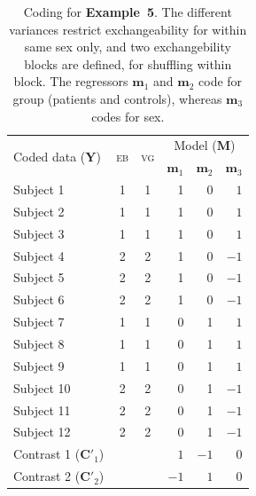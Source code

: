 \begin{table}[!t]
\caption[Coding for Example 5]{Coding for \textbf{Example~5}. The different variances restrict exchangeability for within same sex only, and two exchangebility blocks are defined, for shuffling within block. The regressors $\mathbf{m}_1$ and $\mathbf{m}_2$ code for group (patients and controls), whereas $\mathbf{m}_3$ codes for sex.}
\begin{center}
{\small
\begin{tabular}{@{}lccrrr@{}}
\toprule
\multirow{2}{*}{\vspace*{-1.7mm}Coded data ($\mathbf{Y}$)} & \multirow{2}{*}{\vspace*{-1.7mm}\textsc{eb}} & \multirow{2}{*}{\vspace*{-1.7mm}\textsc{vg}} & \multicolumn{3}{c}{Model ($\mathbf{M}$)\hspace*{-3mm}}\\
\cmidrule(l){4-6}
& & & $\mathbf{m}_1$ & $\mathbf{m}_2$ & $\mathbf{m}_3$\\
\midrule
Subject 1  & 1 & 1 & 1 & 0 & $1$\\
Subject 2  & 1 & 1 & 1 & 0 & $1$\\
Subject 3  & 1 & 1 & 1 & 0 & $1$\\
Subject 4  & 2 & 2 & 1 & 0 & $-1$\\
Subject 5  & 2 & 2 & 1 & 0 & $-1$\\
Subject 6  & 2 & 2 & 1 & 0 & $-1$\\
Subject 7  & 1 & 1 & 0 & 1 & $1$\\
Subject 8  & 1 & 1 & 0 & 1 & $1$\\
Subject 9  & 1 & 1 & 0 & 1 & $1$\\
Subject 10 & 2 & 2 & 0 & 1 & $-1$\\
Subject 11 & 2 & 2 & 0 & 1 & $-1$\\
Subject 12 & 2 & 2 & 0 & 1 & $-1$\\
\midrule
Contrast 1 ($\mathbf{C}'_1$) & & & $1$ & $-1$ & 0\\
Contrast 2 ($\mathbf{C}'_2$) & & & $-1$ & $1$ & 0\\
\bottomrule
\end{tabular}}
\end{center}
\label{tab:perm:ex_variance}
\end{table}

